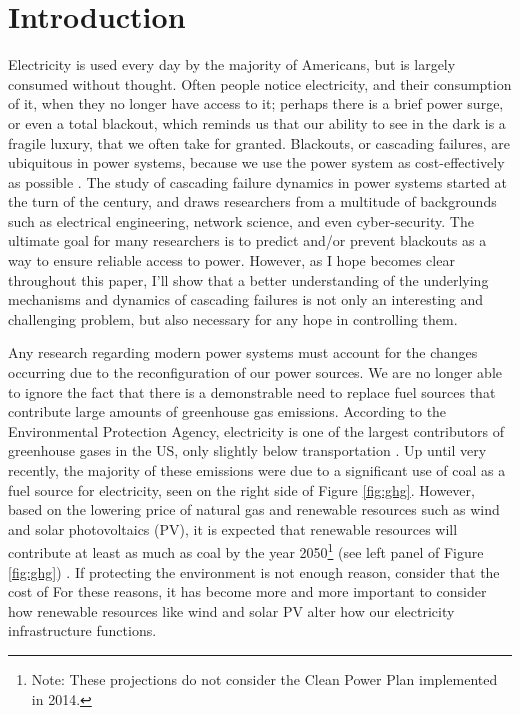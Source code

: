 \chapter{Introduction}
\label{ch:intro}
Electricity is used every day by the majority of Americans, but is largely consumed without thought.  Often people notice electricity, and their consumption of it, when they no longer have access to it; perhaps there is a brief power surge, or even a total blackout, which reminds us that our ability to see in the dark is a fragile luxury, that we often take for granted.  Blackouts, or cascading failures, are ubiquitous in power systems, because we use the power system as cost-effectively as possible \cite{na_cf_stats}.  The study of cascading failure dynamics in power systems started at the turn of the century, and draws researchers from a multitude of backgrounds such as electrical engineering, network science, and even cyber-security.  The ultimate goal for many researchers is to predict and/or prevent blackouts as a way to ensure reliable access to power.  However, as I hope becomes clear throughout this paper, I'll show that a better understanding of the underlying mechanisms and dynamics of cascading failures is not only an interesting and challenging problem, but also necessary for any hope in controlling them.



Any research regarding modern power systems must account for the changes occurring due to the reconfiguration of our power sources.  We are no longer able to ignore the fact that there is a demonstrable need to replace fuel sources that contribute large amounts of greenhouse gas emissions. According to the Environmental Protection Agency, electricity is one of the largest contributors of greenhouse gases in the US, only slightly below transportation \cite{greenhouse_gas}.  Up until very recently, the majority of these emissions were due to a significant use of coal as a fuel source for electricity, seen on the right side of Figure \ref{fig:ghg}.  However, based on the lowering price of natural gas and renewable resources such as wind and solar photovoltaics (PV), it is expected that renewable resources will contribute at least as much as coal by the year 2050\footnote{Note: These projections do not consider the Clean Power Plan implemented in 2014.} (see left panel of Figure \ref{fig:ghg}) \cite{eia_eo}.  If protecting the environment is not enough reason, consider that the cost of For these reasons, it has become more and more important to consider how renewable resources like wind and solar PV alter how our electricity infrastructure functions.

